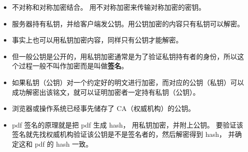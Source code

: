 
\begin{itemize}
\item 不对称和对称加密结合。 用不对称加密来传输对称加密的密钥。
\item 服务器持有私钥，并给客户端发公钥。用公钥加密的内容只有私钥可以解密。
\item 事实上也可以用私钥加密内容，同样只有公钥才能解密。
\item 但一般公钥是公开的，用私钥加密通常是为了验证私钥持有者的身份，所以这个过程一般不叫作加密而是叫做\textbf{签名}。
\item 如果私钥（公钥）对一个约定好的明文进行加密，而对应的公钥（私钥）可以成功解密出该铭文，就可以证明加密者一定持有私钥（公钥）。
\item 浏览器或操作系统已经事先储存了 CA（权威机构）的公钥。

\item pdf 签名的原理就是把 pdf 生成 hash， 用私钥加密，并附上公钥。 要验证该签名就先找权威机构验证该公钥是不是签名者的，然后解密得到 hash， 并确定这和 pdf 的 hash 一致。
\end{itemize}

